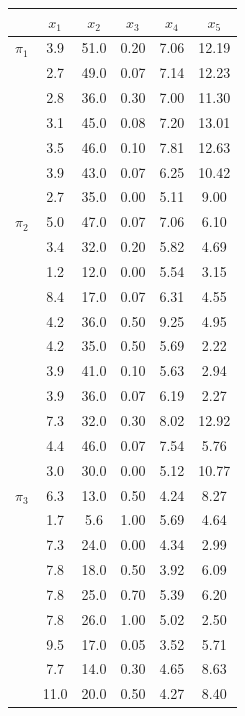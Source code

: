 \begin{mvtable}
\label{tab:11.7}
\begin{tabular}{lccccc}
\toprule
& $x_1$ & $x_2$ & $x_3$ & $x_4$ & $x_5$\\
\midrule
$\pi_1$ & 3.9 & 51.0 & 0.20 & 7.06 & 12.19\\
& 2.7 & 49.0 & 0.07 & 7.14 & 12.23\\
& 2.8 & 36.0 & 0.30 & 7.00 & 11.30\\
& 3.1 & 45.0 & 0.08 & 7.20 & 13.01\\
& 3.5 & 46.0 & 0.10 & 7.81 & 12.63\\
& 3.9 & 43.0 & 0.07 & 6.25 & 10.42\\
& 2.7 & 35.0 & 0.00 & 5.11 & 9.00\\
$\pi_2$ & 5.0 & 47.0 & 0.07 & 7.06 & 6.10\\
& 3.4 & 32.0 & 0.20 & 5.82 & 4.69\\
& 1.2 & 12.0 & 0.00 & 5.54 & 3.15\\
& 8.4 & 17.0 & 0.07 & 6.31 & 4.55\\
& 4.2 & 36.0 & 0.50 & 9.25 & 4.95\\
& 4.2 & 35.0 & 0.50 & 5.69 & 2.22\\
& 3.9 & 41.0 & 0.10 & 5.63 & 2.94\\
& 3.9 & 36.0 & 0.07 & 6.19 & 2.27\\
& 7.3 & 32.0 & 0.30 & 8.02 & 12.92\\
& 4.4 & 46.0 & 0.07 & 7.54 & 5.76\\
& 3.0 & 30.0 & 0.00 & 5.12 & 10.77\\
$\pi_3$ & 6.3 & 13.0 & 0.50 & 4.24 & 8.27\\
& 1.7 & 5.6 & 1.00 & 5.69 & 4.64\\
& 7.3 & 24.0 & 0.00 & 4.34 & 2.99\\
& 7.8 & 18.0 & 0.50 & 3.92 & 6.09\\
& 7.8 & 25.0 & 0.70 & 5.39 & 6.20\\
& 7.8 & 26.0 & 1.00 & 5.02 & 2.50\\
& 9.5 & 17.0 & 0.05 & 3.52 & 5.71\\
& 7.7 & 14.0 & 0.30 & 4.65 & 8.63\\
& 11.0 & 20.0 & 0.50 & 4.27 & 8.40\\
\bottomrule
\end{tabular}
\end{mvtable}
